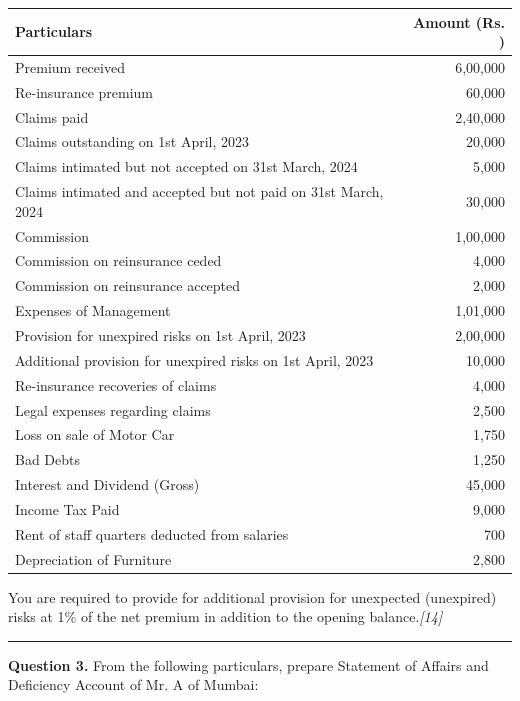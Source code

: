 \documentclass[11pt,a4paper]{article}
\newcommand{\pts}[1]{\hfill   \textit{[#1]}}
\begin{document}
\begin{center}
\small

\begin{tabular}{|l|r|}
\hline
   \textbf{Particulars} &   \textbf{Amount (Rs. )} \\
\hline
Premium received & 6,00,000 \\
Re-insurance premium & 60,000 \\
Claims paid & 2,40,000 \\
Claims outstanding on 1st April, 2023 & 20,000 \\
Claims intimated but not accepted on 31st March, 2024 & 5,000 \\
Claims intimated and accepted but not paid on 31st March, 2024 & 30,000 \\
Commission & 1,00,000 \\
Commission on reinsurance ceded & 4,000 \\
Commission on reinsurance accepted & 2,000 \\
Expenses of Management & 1,01,000 \\
Provision for unexpired risks on 1st April, 2023 & 2,00,000 \\
Additional provision for unexpired risks on 1st April, 2023 & 10,000 \\
Re-insurance recoveries of claims & 4,000 \\
Legal expenses regarding claims & 2,500 \\
Loss on sale of Motor Car & 1,750 \\
Bad Debts & 1,250 \\
Interest and Dividend (Gross) & 45,000 \\
Income Tax Paid & 9,000 \\
Rent of staff quarters deducted from salaries & 700 \\
Depreciation of Furniture & 2,800 \\
\hline
\end{tabular}
\end{center}

You are required to provide for additional provision for unexpected (unexpired) risks at 1\% of the net premium in addition to the opening balance.\pts{14}

\medskip\rule{\linewidth}{0.2pt}

\pagebreak




\noindent   \textbf{Question 3.}
From the following particulars, prepare Statement of Affairs and Deficiency Account of Mr. A of Mumbai:
\end{document}
